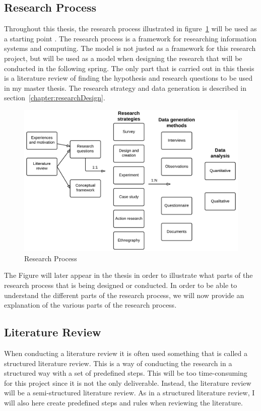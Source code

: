     \subsection{Research Process} \label{sec:methodresearchprocess}

    Throughout this thesis, the research process illustrated in figure~\ref{fig:researchProcess1} will be used as a starting point \cite{empiriske}. The research process is a framework for researching information systems and computing. The model is not justed as a framework for this research project, but will be used as a model when designing the research that will be conducted in the following spring. The only part that is carried out in this thesis is a literature review of finding the hypothesis and research questions to be used in my master thesis. The research strategy and data generation is described in section~\ref{chapter:researchDesign}.

      \begin{figure}[H]
        \centering
        \includegraphics[scale=0.18]{pics/ResearchProcess.png}
        \caption[Research process]{Research Process \cite{empiriske}}
        \label{fig:researchProcess1}
      \end{figure}

    The Figure will later appear in the thesis in order to illustrate what parts of the research process that is being designed or conducted. In order to be able to understand the different parts of the research process, we will now provide an explanation of the various parts of the research process.

    \subsection{Literature Review}\label{sec:methodliteraturereview}
    When conducting a literature review it is often used something that is called a structured literature review. This is a way of conducting the research in a structured way with a set of predefined steps. This will be too time-consuming for this project since it is not the only deliverable. Instead, the literature review will be a semi-structured literature review. As in a structured literature review, I will also here create predefined steps and rules when reviewing the literature. 

